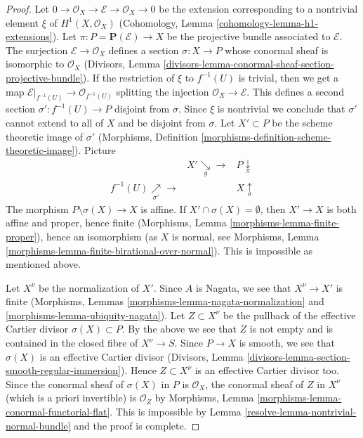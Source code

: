 \begin{proof}

Let $0 \to \mathcal{O}_X \to \mathcal{E} \to \mathcal{O}_X \to 0$ be the
extension corresponding to a nontrivial element $\xi$ of
$H^1(X, \mathcal{O}_X)$
(Cohomology, Lemma \ref{cohomology-lemma-h1-extensions}).
Let $\pi : P = \mathbf{P}(\mathcal{E}) \to X$
be the projective bundle associated to $\mathcal{E}$.
The surjection $\mathcal{E} \to \mathcal{O}_X$
defines a section $\sigma : X \to P$ whose conormal sheaf is
isomorphic to $\mathcal{O}_X$ (Divisors, Lemma
\ref{divisors-lemma-conormal-sheaf-section-projective-bundle}).
If the restriction of $\xi$ to $f^{-1}(U)$ is trivial, then we get
a map $\mathcal{E}|_{f^{-1}(U)} \to \mathcal{O}_{f^{-1}(U)}$ splitting
the injection $\mathcal{O}_X \to \mathcal{E}$. This defines a second
section $\sigma' : f^{-1}(U) \to P$ disjoint from $\sigma$. Since $\xi$
is nontrivial we conclude that $\sigma'$ cannot extend to all of $X$
and be disjoint from $\sigma$. Let $X' \subset P$ be the
scheme theoretic image of $\sigma'$ (Morphisms,
Definition \ref{morphisms-definition-scheme-theoretic-image}).
Picture
$$
\begin{array}{ccc} & X' \underset{g}{\searrow}\longrightarrow & P \underset{\pi}{\downarrow} \\ f^{-1}(U) \underset{\sigma'}{\nearrow}\longrightarrow &  & X \underset{\sigma}{\uparrow}\end{array}
$$
The morphism $P \setminus \sigma(X) \to X$ is affine.
If $X' \cap \sigma(X) = \emptyset$, then $X' \to X$ is both affine
and proper, hence finite
(Morphisms, Lemma \ref{morphisms-lemma-finite-proper}),
hence an isomorphism (as $X$ is normal, see
Morphisms, Lemma \ref{morphisms-lemma-finite-birational-over-normal}).
This is impossible as mentioned above.

\medskip\noindent
Let $X^\nu$ be the normalization of $X'$.
Since $A$ is Nagata, we see that $X^\nu \to X'$ is finite
(Morphisms, Lemmas \ref{morphisms-lemma-nagata-normalization} and
\ref{morphisms-lemma-ubiquity-nagata}). Let $Z \subset X^\nu$ be the
pullback of the effective Cartier divisor $\sigma(X) \subset P$.
By the above we see that $Z$ is not empty and is contained
in the closed fibre of $X^\nu \to S$.
Since $P \to X$ is smooth, we see that $\sigma(X)$ is an effective
Cartier divisor
(Divisors, Lemma \ref{divisors-lemma-section-smooth-regular-immersion}).
Hence $Z \subset X^\nu$ is an effective Cartier divisor too.
Since the conormal sheaf of $\sigma(X)$ in $P$ is $\mathcal{O}_X$, the
conormal sheaf of $Z$ in $X^\nu$ (which is a priori invertible)
is $\mathcal{O}_Z$ by
Morphisms, Lemma \ref{morphisms-lemma-conormal-functorial-flat}.
This is impossible by
Lemma \ref{resolve-lemma-nontrivial-normal-bundle}
and the proof is complete.
\end{proof}

